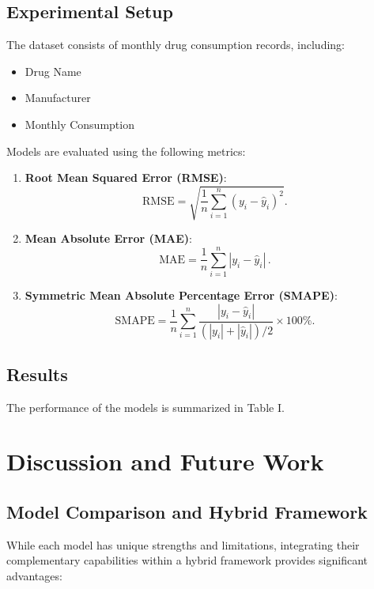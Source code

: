 \documentclass[journal]{IEEEtran}
\begin{document}
\subsection{Experimental Setup}
The dataset consists of monthly drug consumption records, including:

\begin{itemize}
    \item Drug Name
    \item Manufacturer
    \item Monthly Consumption
\end{itemize}

Models are evaluated using the following metrics:

\begin{enumerate}
    \item \textbf{Root Mean Squared Error (RMSE)}:
    \begin{equation}
    \text{RMSE}=\sqrt{\frac{1}{n}\sum_{i=1}^{n}(y_{i}-\hat{y}_{i})^{2}}.
    \end{equation}

    \item \textbf{Mean Absolute Error (MAE)}:
    \begin{equation}
    \text{MAE}=\frac{1}{n}\sum_{i=1}^{n}|y_{i}-\hat{y}_{i}|\,.
    \end{equation}

    \item \textbf{Symmetric Mean Absolute Percentage Error (SMAPE)}:
    \begin{equation}
    \text{SMAPE}=\frac{1}{n}\sum_{i=1}^{n}\frac{|y_{i}-\hat{y}_{i}|}{(|y_{i}|+|\hat{y}_{i}|)/2}\times 100\%.
    \end{equation}
\end{enumerate}

\subsection{Results}
The performance of the models is summarized in Table I.

\section{Discussion and Future Work}
\subsection{Model Comparison and Hybrid Framework}
While each model has unique strengths and limitations, integrating their complementary capabilities within a hybrid framework provides significant advantages:
\end{document}
